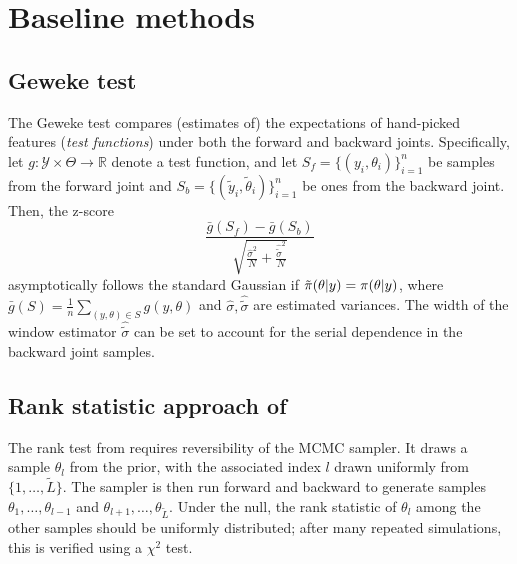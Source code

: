 \appendix

\section{Baseline methods}
\subsection{Geweke test}
The Geweke test \citep{geweke_getting_2004} compares (estimates of) the expectations of hand-picked features (\emph{test functions}) under both the forward and backward joints. 
Specifically, let $g: \mathcal{Y}\times \Theta\to \mathbb{R}$ denote a test function, and let  $S_f=\{(y_i, \theta_i)\}_{i=1}^n$ be samples from the forward joint and $S_b=\{(\tilde{y}_i, \tilde{\theta}_i)\}_{i=1}^n$ be ones from the backward joint.
Then, the z-score 
\begin{equation}
    \frac{\bar{g}(S_f) - \bar{g}(S_b)}{\sqrt{ \frac{\hat{\sigma}^{2}}{N} + \frac{\hat{\tilde{\sigma}}^{2}}{N}}} 
    \label{eq:geweke}
\end{equation}
asymptotically follows the standard Gaussian if $\tilde{\pi}(\theta\vert y)=\pi(\theta\vert y)$, where $\bar{g}(S) = \frac{1}{n}\sum_{(y,\theta) \in S}g(y, \theta)$ and $\hat{\sigma}, \hat{\tilde{\sigma}}$ are estimated variances. 
The width of the window estimator $\hat{\tilde{\sigma}}$ can be set to account for the serial dependence in the backward joint samples.


\subsection{Rank statistic approach of \cite{gandy_unit_2020}}
The rank test from \cite{gandy_unit_2020} requires reversibility of the MCMC sampler. It draws a sample $\theta_{l}$ from the prior, with the associated index $l$ drawn uniformly from $\{1,\ldots,\tilde{L}\}$. The sampler is then run forward and backward to generate samples $\theta_{1}, \ldots, \theta_{l-1}$ and $\theta_{l+1}, \ldots, \theta_{\tilde{L}} $. Under the null, the rank statistic of $\theta_{l}$ among the other samples should be uniformly distributed; after many repeated simulations, this is verified using a $\chi^{2}$ test.

